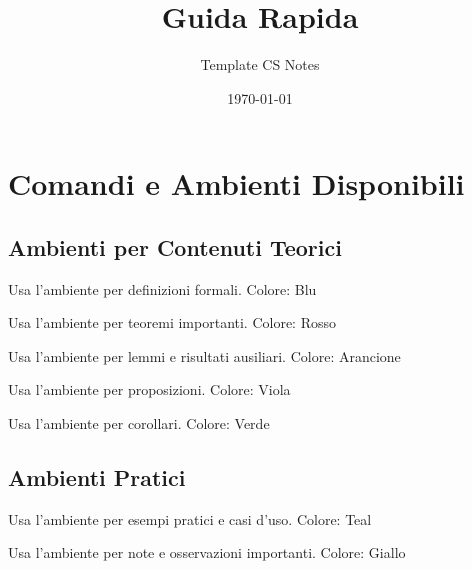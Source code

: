 \documentclass{csnotes}
\title{Guida Rapida}
\author{Template CS Notes}
\date{\today}
\begin{document}
\maketitlepage{}
\tableofcontents
\newpage


\section{Comandi e Ambienti Disponibili}

\subsection{Ambienti per Contenuti Teorici}

\begin{definition}
Usa l'ambiente  per definizioni formali.
Colore: Blu
\end{definition}

\begin{theorem}
Usa l'ambiente  per teoremi importanti.
Colore: Rosso
\end{theorem}

\begin{lemma}
Usa l'ambiente  per lemmi e risultati ausiliari.
Colore: Arancione
\end{lemma}

\begin{proposition}
Usa l'ambiente  per proposizioni.
Colore: Viola
\end{proposition}

\begin{corollary}
Usa l'ambiente  per corollari.
Colore: Verde
\end{corollary}

\subsection{Ambienti Pratici}

\begin{example}
Usa l'ambiente  per esempi pratici e casi d'uso.
Colore: Teal
\end{example}

\begin{note}
Usa l'ambiente  per note e osservazioni importanti.
Colore: Giallo
\end{note}
\end{document}
